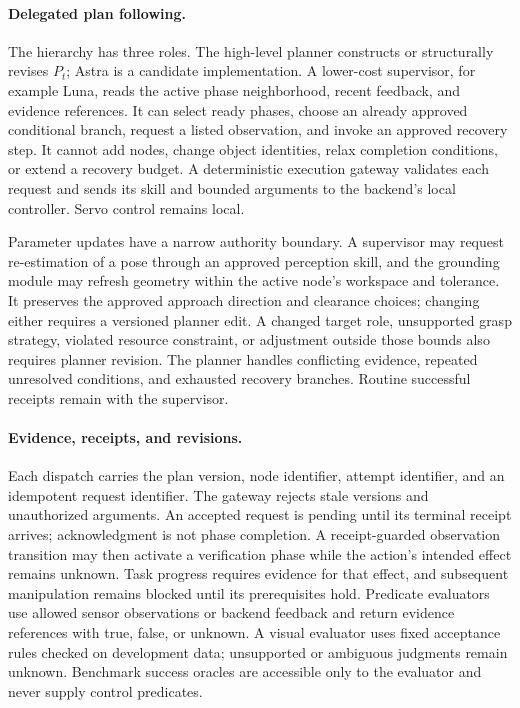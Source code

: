 \paragraph{Delegated plan following.}
The hierarchy has three roles. The high-level planner constructs or structurally revises $P_t$; Astra is a candidate implementation. A lower-cost supervisor, for example Luna, reads the active phase neighborhood, recent feedback, and evidence references. It can select ready phases, choose an already approved conditional branch, request a listed observation, and invoke an approved recovery step. It cannot add nodes, change object identities, relax completion conditions, or extend a recovery budget. A deterministic execution gateway validates each request and sends its skill and bounded arguments to the backend's local controller. Servo control remains local.

Parameter updates have a narrow authority boundary. A supervisor may request re-estimation of a pose through an approved perception skill, and the grounding module may refresh geometry within the active node's workspace and tolerance. It preserves the approved approach direction and clearance choices; changing either requires a versioned planner edit. A changed target role, unsupported grasp strategy, violated resource constraint, or adjustment outside those bounds also requires planner revision. The planner handles conflicting evidence, repeated unresolved conditions, and exhausted recovery branches. Routine successful receipts remain with the supervisor.

\paragraph{Evidence, receipts, and revisions.}
Each dispatch carries the plan version, node identifier, attempt identifier, and an idempotent request identifier. The gateway rejects stale versions and unauthorized arguments. An accepted request is pending until its terminal receipt arrives; acknowledgment is not phase completion. A receipt-guarded observation transition may then activate a verification phase while the action's intended effect remains unknown. Task progress requires evidence for that effect, and subsequent manipulation remains blocked until its prerequisites hold. Predicate evaluators use allowed sensor observations or backend feedback and return evidence references with true, false, or unknown. A visual evaluator uses fixed acceptance rules checked on development data; unsupported or ambiguous judgments remain unknown. Benchmark success oracles are accessible only to the evaluator and never supply control predicates.

